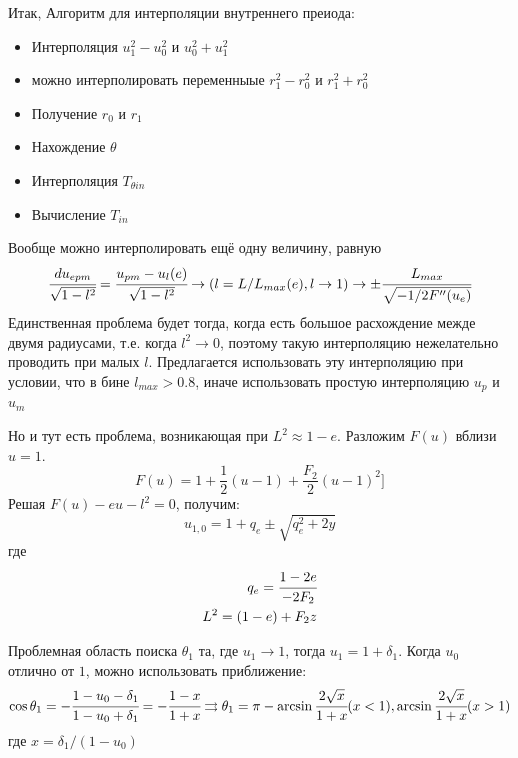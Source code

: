 	Итак, Алгоритм для интерполяции внутреннего преиода:
	\begin{itemize}
		\item Интерполяция $u_1^2-u_0^2$ и $u_0^2+u_1^2$
		\item можно интерполировать переменныые $r_1^2-r_0^2$ и $r_1^2+r_0^2$
		\item Получение $r_0$ и $r_1$
		\item Нахождение $\theta$
		\item Интерполяция $T_{\theta in}$ 
		\item Вычисление $T_{in}$
	\end{itemize}
	
	Вообще можно интерполировать ещё одну величину, равную
	\begin{equation}
		\cfrac{du_{e pm}}{\sqrt{1 - l^2}} = \cfrac{u_{pm} - u_l(e)}{\sqrt{1 - l^2}}  \rightarrow  ( l = L/L_{max}(e),  l \rightarrow 1)  \rightarrow  \pm \cfrac{L_{max}}{\sqrt{-1/2F''(u_e)}}
		\label{eq:duepm}
	\end{equation}
	Единственная проблема будет тогда, когда есть большое расхождение межде двумя радиусами, т.е. когда $l^2 \rightarrow 0$, поэтому такую интерполяцию нежелательно проводить при малых $l$.
	Предлагается использовать эту интерполяцию при условии, что в бине $l_{max} > 0.8$, иначе использовать простую интерполяцию $u_p$ и $u_m$
	
	Но и тут есть проблема, возникающая при $L^2 \approx 1-e$. Разложим $F(u)$ вблизи $u = 1$.
	 \begin{equation}
		F(u) = 1 + \frac{1}{2} (u-1) + \frac{F_2}{2}(u-1)^2
	 	]\label{eq:Fu_more_1}
	 \end{equation}
	 Решая $F(u) - eu - l^2 = 0$, получим:
	\begin{equation}
	 	u_{1,0} = 1 + q_e \pm \sqrt{q_e^2 + 2y}
	 	\label{eq:u01_near1}
	\end{equation}
	где
	\begin{eqnarray*}
		q_e = \cfrac{1-2e}{-2F_2}\\
		L^2 = (1-e) + F_2z
	\end{eqnarray*}
	
	Проблемная область поиска $\theta_1$ та, где $u_1 \rightarrow 1$, тогда $u_1 = 1 + \delta_1$. Когда $u_0$ отлично от $1$, можно использовать приближение:
	\begin{equation*}
		\cos {\theta_1} = -\cfrac{1-u_0-\delta_1}{1-u_0+\delta_1} = -\cfrac{1-x}{1+x} \rightrightarrows \theta_1 =  \pi - \arcsin {\cfrac{2\sqrt{x}}{1+x} } (x < 1), \arcsin {\cfrac{2\sqrt{x}}{1+x} } (x > 1)
	\end{equation*} 
	где $x = \delta_1/(1-u_0)$
	
